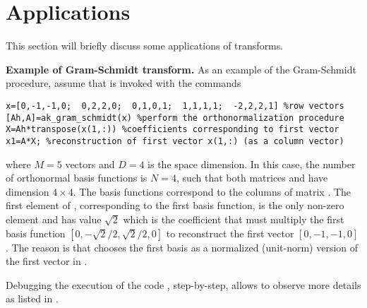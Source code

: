 \section{Applications}
\label{sec:transf_applic}

This section will briefly discuss some applications of transforms.

\ifdefined\akAmazonBook
\else
\bApplication \textbf{Example of Gram-Schmidt transform.}
\label{app:gram_schmidt}
As an example of the Gram-Schmidt procedure, assume that  is invoked with the commands
\begin{lstlisting}
x=[0,-1,-1,0;  0,2,2,0;  0,1,0,1;  1,1,1,1;  -2,2,2,1] %row vectors
[Ah,A]=ak_gram_schmidt(x) %perform the orthonormalization procedure
X=Ah*transpose(x(1,:)) %coefficients corresponding to first vector
x1=A*X; %reconstruction of first vector x(1,:) (as a column vector)
\end{lstlisting}
where $M=5$ vectors and $D=4$ is the space dimension. In this case, the number of orthonormal basis functions is $N=4$, such that both matrices  and  have dimension $4 \times 4$. The basis functions correspond to the columns of matrix . The first element of , corresponding to the first basis function, is the only non-zero element and has value $\sqrt{2}$ which is the coefficient that must multiply the first basis function $[0,-\sqrt{2}/2,\sqrt{2}/2,0]$ to reconstruct the first vector $[0,-1,-1,0]$. The reason is that  chooses the first basis as a normalized (unit-norm) version of the first vector in .

Debugging the execution of the code , step-by-step, allows to observe more details as listed in .

